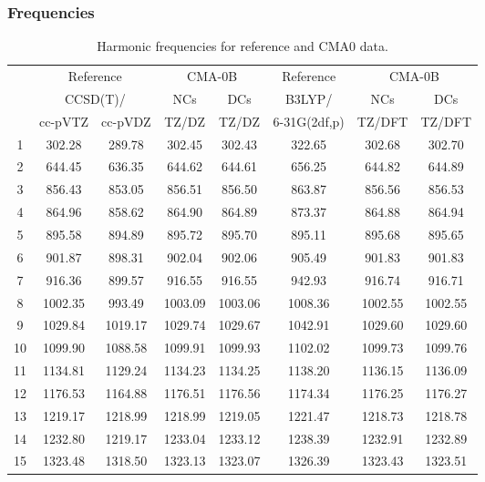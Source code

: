 \documentclass[10pt,oneside]{article}
\begin{document}
\clearpage

\subsubsection*{Frequencies}
\begin{table}[h!]
\centering
\caption{Harmonic frequencies for reference and CMA0 data.}
\begin{tabular}{cccccccc}
\toprule
{} & \multicolumn{2}{c}{Reference} & \multicolumn{2}{c}{CMA-0B} &    Reference & \multicolumn{2}{c}{CMA-0B} \\
{} & \multicolumn{2}{c}{CCSD(T)/} &     NCs &     DCs &       B3LYP/ &     NCs &     DCs \\
{} &   cc-pVTZ & cc-pVDZ &   TZ/DZ &   TZ/DZ & 6-31G(2df,p) &  TZ/DFT &  TZ/DFT \\
\midrule
1  &    302.28 &  289.78 &  302.45 &  302.43 &       322.65 &  302.68 &  302.70 \\
2  &    644.45 &  636.35 &  644.62 &  644.61 &       656.25 &  644.82 &  644.89 \\
3  &    856.43 &  853.05 &  856.51 &  856.50 &       863.87 &  856.56 &  856.53 \\
4  &    864.96 &  858.62 &  864.90 &  864.89 &       873.37 &  864.88 &  864.94 \\
5  &    895.58 &  894.89 &  895.72 &  895.70 &       895.11 &  895.68 &  895.65 \\
6  &    901.87 &  898.31 &  902.04 &  902.06 &       905.49 &  901.83 &  901.83 \\
7  &    916.36 &  899.57 &  916.55 &  916.55 &       942.93 &  916.74 &  916.71 \\
8  &   1002.35 &  993.49 & 1003.09 & 1003.06 &      1008.36 & 1002.55 & 1002.55 \\
9  &   1029.84 & 1019.17 & 1029.74 & 1029.67 &      1042.91 & 1029.60 & 1029.60 \\
10 &   1099.90 & 1088.58 & 1099.91 & 1099.93 &      1102.02 & 1099.73 & 1099.76 \\
11 &   1134.81 & 1129.24 & 1134.23 & 1134.25 &      1138.20 & 1136.15 & 1136.09 \\
12 &   1176.53 & 1164.88 & 1176.51 & 1176.56 &      1174.34 & 1176.25 & 1176.27 \\
13 &   1219.17 & 1218.99 & 1218.99 & 1219.05 &      1221.47 & 1218.73 & 1218.78 \\
14 &   1232.80 & 1219.17 & 1233.04 & 1233.12 &      1238.39 & 1232.91 & 1232.89 \\
15 &   1323.48 & 1318.50 & 1323.13 & 1323.07 &      1326.39 & 1323.43 & 1323.51 \\

\end{tabular}
\end{table}
\end{document}
